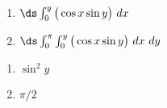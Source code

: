 {\begin{enumerate}
	\item $\ds \int_0^{y} \big(\cos x\sin y\big)\ dx$\\
	\item $\ds \int_0^\pi \int_0^{y} \big(\cos x\sin y\big)\ dx\ dy$
\end{enumerate}
}
{\begin{enumerate}
	\item $\sin^2y$
	\item	$\pi/2$
\end{enumerate}
}
